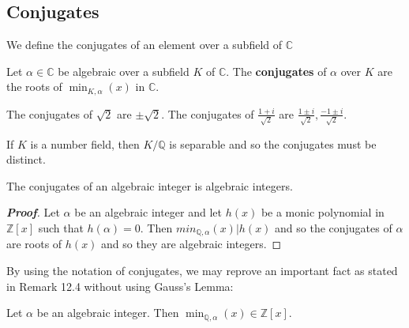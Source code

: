 \subsection{Conjugates}

We define the conjugates of an element over a subfield of $\mathbb{C}$

\begin{definition} Let $\alpha \in \mathbb{C}$ be algebraic over a subfield $K$ of $\mathbb{C}$. The {\bf conjugates} of $\alpha$ over $K$ are the roots of $\min_{K,\alpha}(x)$ in $\mathbb{C}$.
\end{definition}

\begin{example} The conjugates of $\sqrt{2}$ are $\pm \sqrt{2}$. The conjugates of $\frac{1+i}{\sqrt{2}}$ are
$\frac{1 \pm i}{\sqrt{2}},\frac{-1 \pm i}{\sqrt{2}}$.
\end{example}

\begin{remark} If $K$ is a number field, then $K/\mathbb{Q}$ is separable and so the conjugates must be distinct.
\end{remark}

\begin{lemma} The conjugates of an algebraic integer is algebraic integers.
\end{lemma}

\begin{proof}[\bf Proof] Let $\alpha$ be an algebraic integer and let $h(x)$ be a monic polynomial in $\mathbb{Z}[x]$ such that $h(\alpha)=0$. Then $min_{\mathbb{Q},\alpha}(x) \big|h(x)$ and so the conjugates of $\alpha$ are roots of $h(x)$ and so they are algebraic integers.
\end{proof}

By using the notation of conjugates, we may reprove an important fact as stated in Remark 12.4 without using Gauss's Lemma:

\begin{theorem} 
Let $\alpha$ be an algebraic integer. Then $\min_{\mathbb{Q},\alpha}(x) \in \mathbb{Z}[x]$.
\end{theorem}

